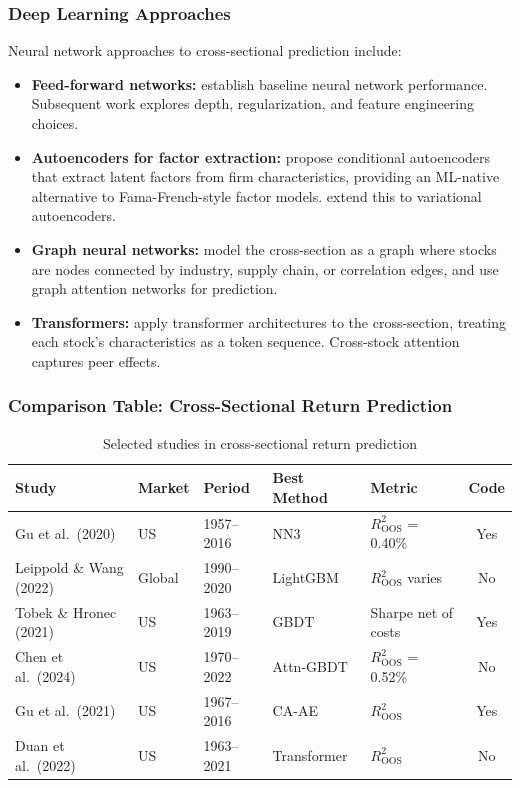 \subsubsection{Deep Learning Approaches}

Neural network approaches to cross-sectional prediction include:

\begin{itemize}[leftmargin=*]
    \item \textbf{Feed-forward networks:} \citet{Gu2020} establish baseline neural network performance. Subsequent work explores depth, regularization, and feature engineering choices.

    \item \textbf{Autoencoders for factor extraction:} \citet{Gu2021} propose conditional autoencoders that extract latent factors from firm characteristics, providing an ML-native alternative to Fama-French-style factor models. \citet{Kim2021} extend this to variational autoencoders.

    \item \textbf{Graph neural networks:} \citet{Chen2022} model the cross-section as a graph where stocks are nodes connected by industry, supply chain, or correlation edges, and use graph attention networks for prediction.

    \item \textbf{Transformers:} \citet{Duan2022} apply transformer architectures to the cross-section, treating each stock's characteristics as a token sequence. Cross-stock attention captures peer effects.
\end{itemize}

\subsubsection{Comparison Table: Cross-Sectional Return Prediction}

\begin{table}[H]
\centering
\caption{Selected studies in cross-sectional return prediction}
\label{tab:cross_section}
\small
\begin{tabularx}{\textwidth}{l l l l l c}
\toprule
\textbf{Study} & \textbf{Market} & \textbf{Period} & \textbf{Best Method} & \textbf{Metric} & \textbf{Code} \\
\midrule
Gu et al.\ (2020)        & US     & 1957--2016 & NN3       & $R^2_{\text{OOS}}$ = 0.40\% & Yes \\
Leippold \& Wang (2022)  & Global & 1990--2020 & LightGBM  & $R^2_{\text{OOS}}$ varies   & No \\
Tobek \& Hronec (2021)   & US     & 1963--2019 & GBDT      & Sharpe net of costs         & Yes \\
Chen et al.\ (2024)      & US     & 1970--2022 & Attn-GBDT & $R^2_{\text{OOS}}$ = 0.52\% & No \\
Gu et al.\ (2021)        & US     & 1967--2016 & CA-AE     & $R^2_{\text{OOS}}$          & Yes \\
Duan et al.\ (2022)      & US     & 1963--2021 & Transformer & $R^2_{\text{OOS}}$        & No \\
\bottomrule
\end{tabularx}
\end{table}

